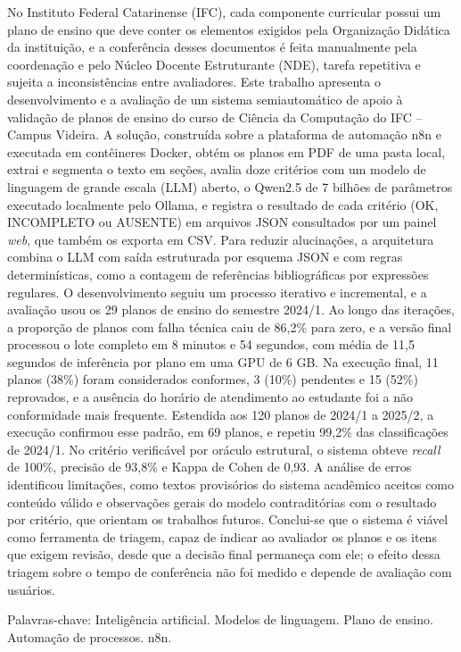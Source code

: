 \begin{resumo}
\noindent
No Instituto Federal Catarinense (IFC), cada componente curricular possui um plano de ensino que deve conter os elementos exigidos pela Organização Didática da instituição, e a conferência desses documentos é feita manualmente pela coordenação e pelo Núcleo Docente Estruturante (NDE), tarefa repetitiva e sujeita a inconsistências entre avaliadores. Este trabalho apresenta o desenvolvimento e a avaliação de um sistema semiautomático de apoio à validação de planos de ensino do curso de Ciência da Computação do IFC -- Campus Videira. A solução, construída sobre a plataforma de automação n8n e executada em contêineres Docker, obtém os planos em PDF de uma pasta local, extrai e segmenta o texto em seções, avalia doze critérios com um modelo de linguagem de grande escala (LLM) aberto, o Qwen2.5 de 7 bilhões de parâmetros executado localmente pelo Ollama, e registra o resultado de cada critério (OK, INCOMPLETO ou AUSENTE) em arquivos JSON consultados por um painel \textit{web}, que também os exporta em CSV. Para reduzir alucinações, a arquitetura combina o LLM com saída estruturada por esquema JSON e com regras determinísticas, como a contagem de referências bibliográficas por expressões regulares. O desenvolvimento seguiu um processo iterativo e incremental, e a avaliação usou os 29 planos de ensino do semestre 2024/1. Ao longo das iterações, a proporção de planos com falha técnica caiu de 86,2\% para zero, e a versão final processou o lote completo em 8 minutos e 54 segundos, com média de 11,5 segundos de inferência por plano em uma GPU de 6 GB. Na execução final, 11 planos (38\%) foram considerados conformes, 3 (10\%) pendentes e 15 (52\%) reprovados, e a ausência do horário de atendimento ao estudante foi a não conformidade mais frequente. Estendida aos 120 planos de 2024/1 a 2025/2, a execução confirmou esse padrão, em 69 planos, e repetiu 99,2\% das classificações de 2024/1. No critério verificável por oráculo estrutural, o sistema obteve \textit{recall} de 100\%, precisão de 93,8\% e Kappa de Cohen de 0,93. A análise de erros identificou limitações, como textos provisórios do sistema acadêmico aceitos como conteúdo válido e observações gerais do modelo contraditórias com o resultado por critério, que orientam os trabalhos futuros. Conclui-se que o sistema é viável como ferramenta de triagem, capaz de indicar ao avaliador os planos e os itens que exigem revisão, desde que a decisão final permaneça com ele; o efeito dessa triagem sobre o tempo de conferência não foi medido e depende de avaliação com usuários.

 \vspace{0.2cm}
\noindent Palavras-chave: Inteligência artificial. Modelos de linguagem. Plano de ensino. Automação de processos. n8n.

\end{resumo}

